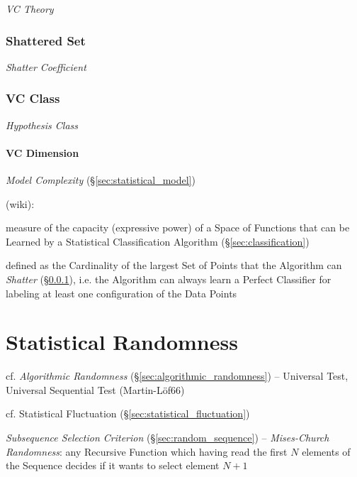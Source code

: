 \emph{VC Theory}



\subsubsection{Shattered Set}\label{sec:shattered_set}

\emph{Shatter Coefficient}



\subsubsection{VC Class}\label{sec:vc_class}

\emph{Hypothesis Class}



\paragraph{VC Dimension}\label{sec:vc_dimension}\hfill

\emph{Model Complexity} (\S\ref{sec:statistical_model})

(wiki):

measure of the capacity (expressive power) of a Space of Functions that can be
Learned by a Statistical Classification Algorithm (\S\ref{sec:classification})

defined as the Cardinality of the largest Set of Points that the Algorithm can
\emph{Shatter} (\S\ref{sec:shattered_set}), i.e. the Algorithm can always learn
a Perfect Classifier for labeling at least one configuration of the Data Points



\section{Statistical Randomness}\label{sec:statistical_randomness}

cf. \emph{Algorithmic Randomness} (\S\ref{sec:algorithmic_randomness}) --
Universal Test, Universal Sequential Test (Martin-L\"of66)

cf. Statistical Fluctuation (\S\ref{sec:statistical_fluctuation})

\emph{Subsequence Selection Criterion} (\S\ref{sec:random_sequence}) --
\emph{Mises-Church Randomness}: any Recursive Function which having read the
first $N$ elements of the Sequence decides if it wants to select element $N+1$

